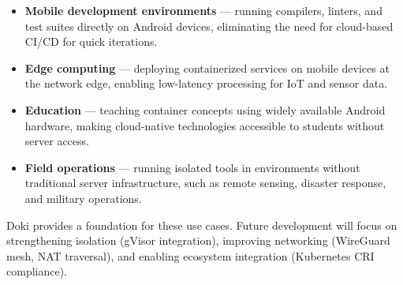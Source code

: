 \begin{itemize}[leftmargin=*, itemsep=4pt]
  \item \textbf{Mobile development environments} --- running
        compilers, linters, and test suites directly on Android
        devices, eliminating the need for cloud-based CI/CD for
        quick iterations.

  \item \textbf{Edge computing} --- deploying containerized services
        on mobile devices at the network edge, enabling low-latency
        processing for IoT and sensor data.

  \item \textbf{Education} --- teaching container concepts using
        widely available Android hardware, making cloud-native
        technologies accessible to students without server access.

  \item \textbf{Field operations} --- running isolated tools in
        environments without traditional server infrastructure,
        such as remote sensing, disaster response, and military
        operations.
\end{itemize}

Doki provides a foundation for these use cases. Future development
will focus on strengthening isolation (gVisor integration), improving
networking (WireGuard mesh, NAT traversal), and enabling ecosystem
integration (Kubernetes CRI compliance).
